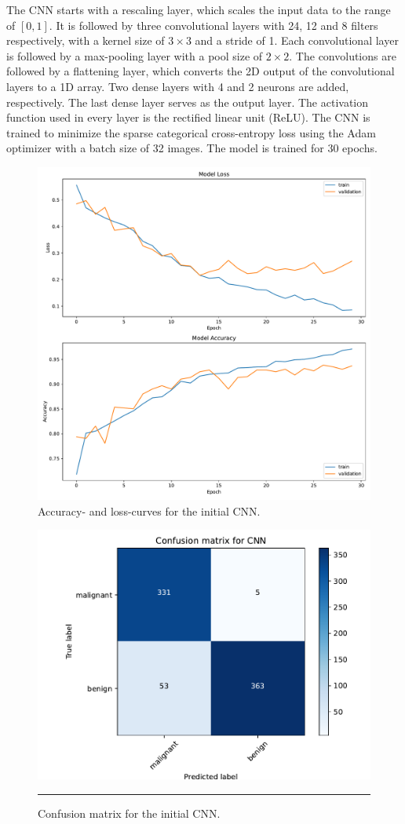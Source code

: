 The CNN starts with a rescaling layer, which scales the input data to the range of $[0, 1]$.
It is followed by three convolutional layers with 24, 12 and 8 filters respectively, with a kernel size of $3 \times 3$ and a stride of 1.
Each convolutional layer is followed by a max-pooling layer with a pool size of $2 \times 2$.
The convolutions are followed by a flattening layer, which converts the 2D output of the convolutional layers to a 1D array.
Two dense layers with 4 and 2 neurons are added, respectively.
The last dense layer serves as the output layer.
The activation function used in every layer is the rectified linear unit (ReLU).
The CNN is trained to minimize the sparse categorical cross-entropy loss using the Adam optimizer \cite{adam} with a batch size of 32 images.
The model is trained for 30 epochs.
\begin{figure}[H]
    \centering
    \includegraphics[width=.65\textwidth]{plots/CNN_history.pdf}
    \caption{Accuracy- and loss-curves for the initial CNN.}
    \label{fig:learningCurveInitial}
\end{figure}
\begin{figure}
    \centering
    \includegraphics[width=.48\textwidth]{plots/confusion_matrix_CNN.pdf}
    \caption{Confusion matrix for the initial CNN.}
    \label{fig:confusionMatrixInitial}
    \rule{4cm}{0cm}
\end{figure}
